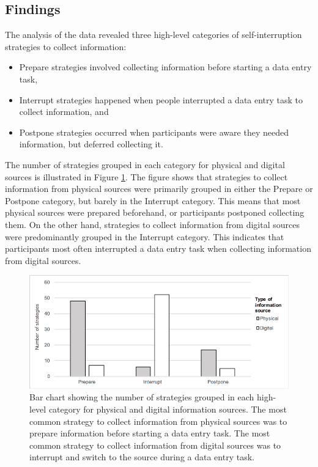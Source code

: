 \subsection{Findings}
The analysis of the data revealed three high-level categories of self-interruption strategies to collect information: 

\begin{itemize}
\item
Prepare strategies involved collecting information before starting a data entry task, 
\item
Interrupt strategies happened when people interrupted a data entry task to collect information, and 
\item
Postpone strategies occurred when participants were aware they needed information, but deferred collecting it. 
\end{itemize}

The number of strategies grouped in each category for physical and digital sources is illustrated in Figure \ref{fig:ch12_graph}. The figure shows that strategies to collect information from physical sources were primarily grouped in either the Prepare or Postpone category, but barely in the Interrupt category. This means that most physical sources were prepared beforehand, or participants postponed collecting them. On the other hand, strategies to collect information from digital sources were predominantly grouped in the Interrupt category. This indicates that participants most often interrupted a data entry task when collecting information from digital sources. 

\begin{figure}
\centering
\includegraphics[scale=0.8]{images/ch12/ch12_graph.pdf}
\caption[Study 2 bar chart of interruption strategies]{Bar chart showing the number of strategies grouped in each high-level category for physical and digital information sources. The most common strategy to collect information from physical sources was to prepare information before starting a data entry task. The most common strategy to collect information from digital sources was to interrupt and switch to the source during a data entry task.}
\label{fig:ch12_graph}
\end{figure}

